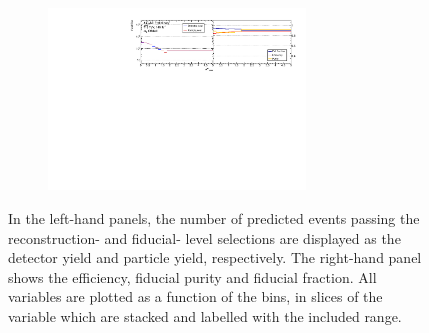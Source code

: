 \begin{figure}[htb]
\begin{subfigure}{.99\textwidth}
    \end{subfigure}
    \begin{subfigure}{.99\textwidth}\centering
        \includegraphics[width = 0.75\textwidth]{Figures/m4l/UnfoldingStudies/v014_inputs/deltaYPairs_m4loffshellinputs.pdf}
    \end{subfigure}
    \caption{In the left-hand panels, the number of predicted events passing the reconstruction- and fiducial- level selections are displayed as the detector yield and particle yield, respectively. The right-hand panel shows the efficiency, fiducial purity and fiducial fraction. All variables are plotted as a function of the \dYPairs bins, in slices of the \mFourL variable which are stacked and labelled with the included \mFourL range.
    \label{fig:dypunf}}
\end{figure}  

\FloatBarrier
\clearpage

